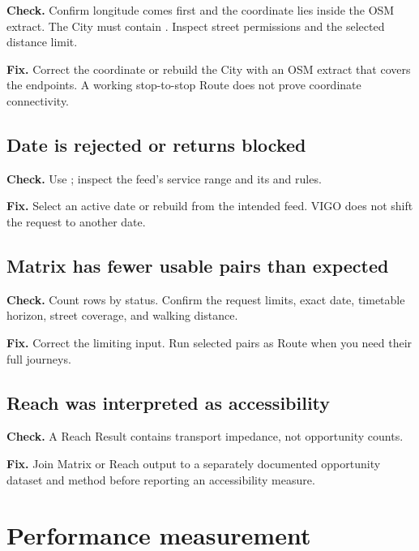 \documentclass[10pt,letterpaper]{article}
\begin{document}
\textbf{Check.} Confirm longitude comes first and the coordinate lies inside the OSM extract. The City must contain . Inspect street permissions and the selected distance limit.

\textbf{Fix.} Correct the coordinate or rebuild the City with an OSM extract that covers the endpoints. A working stop-to-stop Route does not prove coordinate connectivity.

\subsection{Date is rejected or returns blocked}

\textbf{Check.} Use ; inspect the feed's service range and its  and  rules.

\textbf{Fix.} Select an active date or rebuild from the intended feed. VIGO does not shift the request to another date.

\subsection{Matrix has fewer usable pairs than expected}

\textbf{Check.} Count rows by status. Confirm the request limits, exact date, timetable horizon, street coverage, and walking distance.

\textbf{Fix.} Correct the limiting input. Run selected pairs as Route when you need their full journeys.

\subsection{Reach was interpreted as accessibility}

\textbf{Check.} A Reach Result contains transport impedance, not opportunity counts.

\textbf{Fix.} Join Matrix or Reach output to a separately documented opportunity dataset and method before reporting an accessibility measure.

\clearpage
\appendix

\section{Performance measurement}
\end{document}
